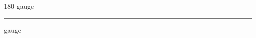 
\begin{frame}
\begin{center}
\begin{turn}{180}
{\fontsize{2.5cm}{1em}\selectfont gauge}
\end{turn}
\vspace{1em}\par  
\hrule
\vspace{1em}\par  
{\fontsize{2.5cm}{1em}\selectfont gauge}
\end{center}
\end{frame}
